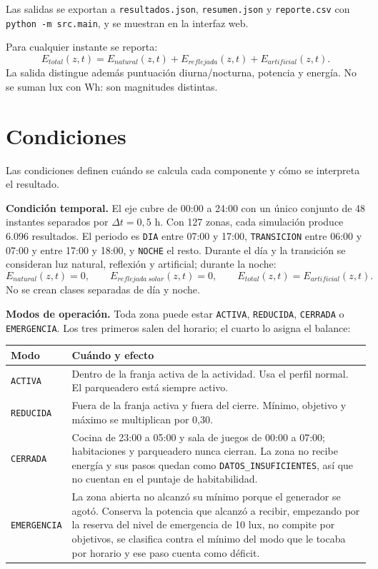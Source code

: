 \documentclass[12pt,a4paper]{article}
\newcommand{\estado}[1]{\texttt{#1}}
\newcommand{\codigo}[1]{\texttt{#1}}
\begin{document}
Las salidas se exportan a \codigo{resultados.json}, \codigo{resumen.json} y \codigo{reporte.csv} con \codigo{python -m src.main}, y se muestran en la interfaz web.

Para cualquier instante se reporta:
\begin{equation}
 E_{total}(z,t)=E_{natural}(z,t)+E_{reflejada}(z,t)+E_{artificial}(z,t).
 \label{eq:totalhotel}
\end{equation}
La salida distingue además puntuación diurna/nocturna, potencia y energía. No se suman lux con Wh: son magnitudes distintas.

\section{Condiciones}

Las condiciones definen cuándo se calcula cada componente y cómo se interpreta el resultado.

\textbf{Condición temporal.} El eje cubre de 00:00 a 24:00 con un único conjunto de 48 instantes separados por $\Delta t=0,5$ h. Con 127 zonas, cada simulación produce 6.096 resultados. El periodo es \codigo{DIA} entre 07:00 y 17:00, \codigo{TRANSICION} entre 06:00 y 07:00 y entre 17:00 y 18:00, y \codigo{NOCHE} el resto. Durante el día y la transición se consideran luz natural, reflexión y artificial; durante la noche:
\begin{equation}
 E_{natural}(z,t)=0,\qquad E_{reflejada\ solar}(z,t)=0,\qquad E_{total}(z,t)=E_{artificial}(z,t).
 \label{eq:noche}
\end{equation}
No se crean clases separadas de día y noche.

\textbf{Modos de operación.} Toda zona puede estar \estado{ACTIVA}, \estado{REDUCIDA}, \estado{CERRADA} o \estado{EMERGENCIA}. Los tres primeros salen del horario; el cuarto lo asigna el balance:

\begin{center}\small
\begin{tabular}{p{}p{}}
\toprule
\textbf{Modo} & \textbf{Cuándo y efecto}\\
\midrule
\estado{ACTIVA} & Dentro de la franja activa de la actividad. Usa el perfil normal. El parqueadero está siempre activo.\\
\estado{REDUCIDA} & Fuera de la franja activa y fuera del cierre. Mínimo, objetivo y máximo se multiplican por 0,30.\\
\estado{CERRADA} & Cocina de 23:00 a 05:00 y sala de juegos de 00:00 a 07:00; habitaciones y parqueadero nunca cierran. La zona no recibe energía y sus pasos quedan como \estado{DATOS\_INSUFICIENTES}, así que no cuentan en el puntaje de habitabilidad.\\
\estado{EMERGENCIA} & La zona abierta no alcanzó su mínimo porque el generador se agotó. Conserva la potencia que alcanzó a recibir, empezando por la reserva del nivel de emergencia de 10 lux, no compite por objetivos, se clasifica contra el mínimo del modo que le tocaba por horario y ese paso cuenta como déficit.\\
\bottomrule
\end{tabular}
\end{center}
\end{document}
